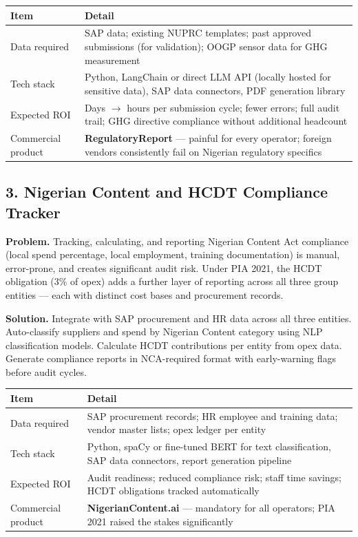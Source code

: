 \documentclass[10pt]{article}
\newcommand{\spacer}{\vspace{10pt}}
\newcommand{\bigspacer}{\vspace{16pt}}
\begin{document}
\spacer
\small
\begin{tabularx}{\columnwidth}{@{}lX@{}}
\toprule
\textbf{Item} & \textbf{Detail} \\
\midrule
Data required     & SAP data; existing NUPRC templates; past approved
                    submissions (for validation); OOGP sensor data for GHG
                    measurement \\
Tech stack        & Python, LangChain or direct LLM API (locally hosted for
                    sensitive data), SAP data connectors, PDF generation
                    library \\
Expected ROI      & Days $\to$ hours per submission cycle; fewer errors;
                    full audit trail; GHG directive compliance without
                    additional headcount \\
Commercial product & \textbf{RegulatoryReport} --- painful for every operator;
                    foreign vendors consistently fail on Nigerian regulatory
                    specifics \\
\bottomrule
\end{tabularx}
\normalsize

\bigspacer

\subsection*{3. Nigerian Content and HCDT Compliance Tracker}

\textbf{Problem.}
Tracking, calculating, and reporting Nigerian Content Act compliance (local
spend percentage, local employment, training documentation) is manual,
error-prone, and creates significant audit risk. Under PIA 2021, the HCDT
obligation (3\% of opex) adds a further layer of reporting across all three
group entities --- each with distinct cost bases and procurement records.

\textbf{Solution.}
Integrate with SAP procurement and HR data across all three entities.
Auto-classify suppliers and spend by Nigerian Content category using NLP
classification models. Calculate HCDT contributions per entity from opex
data. Generate compliance reports in NCA-required format with early-warning
flags before audit cycles.

\spacer
\small
\begin{tabularx}{\columnwidth}{@{}lX@{}}
\toprule
\textbf{Item} & \textbf{Detail} \\
\midrule
Data required     & SAP procurement records; HR employee and training data;
                    vendor master lists; opex ledger per entity \\
Tech stack        & Python, spaCy or fine-tuned BERT for text classification,
                    SAP data connectors, report generation pipeline \\
Expected ROI      & Audit readiness; reduced compliance risk; staff time
                    savings; HCDT obligations tracked automatically \\
Commercial product & \textbf{NigerianContent.ai} --- mandatory for all operators;
                    PIA 2021 raised the stakes significantly \\
\bottomrule
\end{tabularx}
\normalsize
\end{document}
